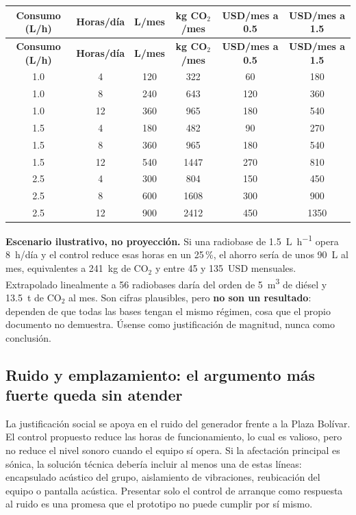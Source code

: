 \documentclass[11pt,a4paper]{article}
\begin{document}
\begingroup\small
\begin{longtable}{@{}cccccc@{}}
\toprule
\textbf{Consumo (L/h)} & \textbf{Horas/día} & \textbf{L/mes} & \textbf{kg CO$_2$/mes} & \textbf{USD/mes a 0.5} & \textbf{USD/mes a 1.5} \\
\midrule
\endfirsthead
\toprule
\textbf{Consumo (L/h)} & \textbf{Horas/día} & \textbf{L/mes} & \textbf{kg CO$_2$/mes} & \textbf{USD/mes a 0.5} & \textbf{USD/mes a 1.5} \\
\midrule
\endhead
1.0 & 4  & 120 & 322  & 60   & 180 \\
1.0 & 8  & 240 & 643  & 120  & 360 \\
1.0 & 12 & 360 & 965  & 180  & 540 \\
1.5 & 4  & 180 & 482  & 90   & 270 \\
1.5 & 8  & 360 & 965  & 180  & 540 \\
1.5 & 12 & 540 & 1447 & 270  & 810 \\
2.5 & 4  & 300 & 804  & 150  & 450 \\
2.5 & 8  & 600 & 1608 & 300  & 900 \\
2.5 & 12 & 900 & 2412 & 450  & 1350 \\
\bottomrule
\end{longtable}
\endgroup

\begin{cajaRecuerda}
\textbf{Escenario ilustrativo, no proyección.} Si una radiobase de \SI{1.5}{\liter\per\hour} opera 8~h/día y el control reduce esas horas en un 25\,\%, el ahorro sería de unos \SI{90}{\liter} al mes, equivalentes a \SI{241}{\kilo\gram} de CO$_2$ y entre 45 y 135~USD mensuales. Extrapolado linealmente a 56 radiobases daría del orden de \SI{5}{\cubic\meter} de diésel y \SI{13.5}{\tonne} de CO$_2$ al mes. Son cifras plausibles, pero \textbf{no son un resultado}: dependen de que todas las bases tengan el mismo régimen, cosa que el propio documento no demuestra. Úsense como justificación de magnitud, nunca como conclusión.
\end{cajaRecuerda}

\subsection{Ruido y emplazamiento: el argumento más fuerte queda sin atender}

La justificación social se apoya en el ruido del generador frente a la Plaza Bolívar. El control propuesto reduce las horas de funcionamiento, lo cual es valioso, pero no reduce el nivel sonoro cuando el equipo sí opera. Si la afectación principal es sónica, la solución técnica debería incluir al menos una de estas líneas: encapsulado acústico del grupo, aislamiento de vibraciones, reubicación del equipo o pantalla acústica. Presentar solo el control de arranque como respuesta al ruido es una promesa que el prototipo no puede cumplir por sí mismo.
\end{document}
